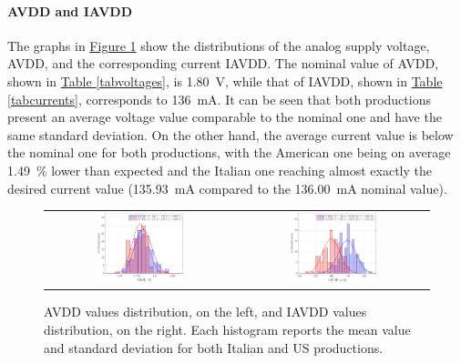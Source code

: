 \paragraph{AVDD and IAVDD} The graphs in \hyperref[figAVDDIVDD]{Figure \ref{figAVDDIVDD}} show the distributions of the analog supply voltage, AVDD, and the corresponding current IAVDD. The nominal value of AVDD, shown in \hyperref[tabvoltages]{Table \ref{tabvoltages}}, is \SI{1.80}{\volt}, while that of IAVDD, shown in \hyperref[tabcurrents]{Table \ref{tabcurrents}}, corresponds to \SI{136}{\milli\ampere}. It can be seen that both productions present an average voltage value comparable to the nominal one and have the same standard deviation. On the other hand, the average current value is below the nominal one for both productions, with the American one being on average \SI{1.49}{\percent} lower than expected and the Italian one reaching almost exactly the desired current value (\SI{135.93}{\milli\ampere} compared to the \SI{136.00}{\milli\ampere} nominal value).

\begin{figure}[ht]
    \centering
    \begin{tabular}{cc}
        \includegraphics[width=0.475\textwidth]{Images/chap2/results/AVDD.pdf} & \includegraphics[width=0.475\textwidth]{Images/chap2/results/IAVDD.pdf}\\
    \end{tabular}
    \caption{AVDD values distribution, on the left, and IAVDD values distribution, on the right. Each histogram reports the mean value and standard deviation for both Italian and US productions.}
    \label{figAVDDIVDD}
\end{figure}

